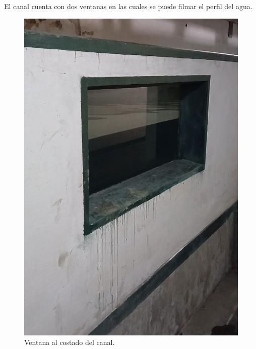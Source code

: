 El canal cuenta con dos ventanas en las cuales se puede filmar el perfil del agua. %

\begin{figure}[th!]
	\centering
	\includegraphics[width=0.2594567\linewidth]{Figures/16_06_2025/Ventana}
	\caption{Ventana al costado del canal.}
	\label{fig:ventana}
\end{figure}

